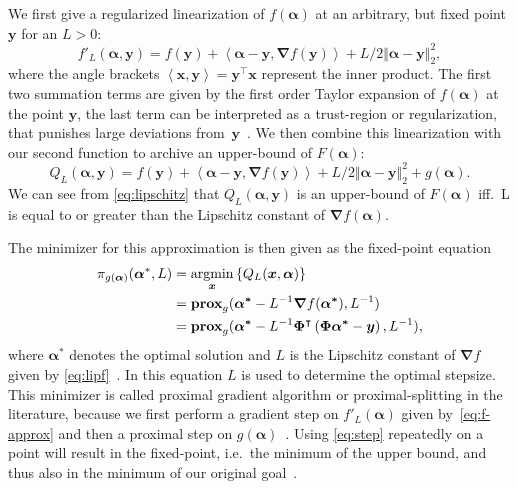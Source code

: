 We first give a regularized linearization of \(f(\bm{\alpha})\) at an arbitrary,
but fixed point \(\bm{y}\) for an \(L > 0\):
\begin{equation}\label{eq:f-approx}
  f'_L(\bm{\alpha}, \bm{y}) = f(\bm{y}) + \left< \bm{\alpha} - \bm{y}, \bm{\nabla} f (\bm{y}) \right> +
  L/2 \Vert \bm{\alpha} - \bm{y} \Vert_2^2,
\end{equation}
where the angle brackets \( \left< \bm{x}, \bm{y} \right> = \bm{y}^\intercal \bm{x} \) represent the inner product.
The first two summation terms are given by the first order Taylor expansion of \(f(\bm{\alpha})\) at the point \(\bm{y}\), the last term can be interpreted as a trust-region or regularization, that punishes large deviations from~\(\bm{y}\)~\cite{proxsurvey}.
We then combine this linearization with our second function to archive an upper-bound of \(F(\bm{\alpha})\):
\begin{equation}\label{eq:goal-approx}
  Q_L(\bm{\alpha}, \bm{y}) = f(\bm{y}) + \left< \bm{\alpha} - \bm{y}, \bm{\nabla} f (\bm{y}) \right> +
  L/2 \Vert \bm{\alpha} - \bm{y} \Vert_2^2 +
  g(\bm{\alpha}).
\end{equation}
We can see from \autoref{eq:lipschitz} that \(Q_L(\bm{\alpha}, \bm{y})\) is an
upper-bound of \(F(\bm{\alpha})\) iff.~L is equal to or greater than the Lipschitz
constant of \(\bm{\nabla} f(\bm{\alpha})\).

The minimizer for this approximation is then given as the fixed-point equation
\begin{align}\label{eq:step}
  \pi_{g(\bm{\alpha})}(\bm{\alpha}^*, L) &=  \argmin_{\bm{x}} \left\{ Q_L(\bm{x}, \bm{\alpha}) \right\}\nonumber\\
       &= \prox[\(g\)]{\bm{\alpha^*} - L^{-1} \bm{\nabla} f (\bm{\alpha^*})}{L^{-1} } \nonumber\\
       &= \prox[\(g\)]{\bm{\alpha^*} - L^{-1} \bm{\Phi}^\intercal \left(\bm{\Phi} \bm{\alpha^*} - \bm{y} \right)}
         {L^{-1}},
\end{align}
where \(\bm{\alpha}^*\) denotes the optimal solution and \(L\) is the Lipschitz constant of \(\bm{\nabla} f\) given by \autoref{eq:lipf}~\cite{fista}.
In this equation \(L\) is used to determine the optimal stepsize.
This minimizer is called proximal gradient algorithm or proximal-splitting in the literature, because we first perform a gradient step on \(f'_L(\bm{\alpha})\) given by~\ref{eq:f-approx} and then a proximal step on \(g(\bm{\alpha})\)~\cite{proxsurvey}.
Using \autoref{eq:step} repeatedly on a point will result in the fixed-point, i.e.~the minimum of the upper bound, and thus also in the minimum of our original goal~\cite{proxsurvey}.

